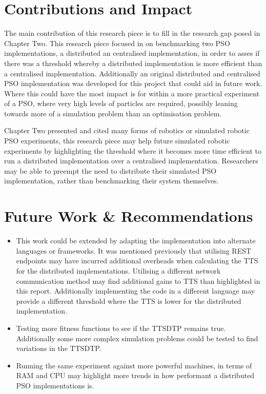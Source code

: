 \documentclass[oneside,12pt]{book}
\begin{document}
\section{Contributions and Impact}
The main contribution of this research piece is to fill in the research gap posed in Chapter Two. This research piece focused in on benchmarking two PSO implementations, a distributed an centralised implementation, in order to asses if there was a threshold whereby a distributed implementation is more efficient than a centralised implementation. Additionally an original distributed and centralised PSO implementation was developed for this project that could aid in future work. Where this could have the most impact is for within a more practical experiment of a PSO, where very high levels of particles are required, possibly leaning towards more of a simulation problem than an optimisation problem.

Chapter Two presented and cited many forms of robotics or simulated robotic PSO experiments, this research piece may help future simulated robotic experiments by highlighting the threshold where it becomes more time efficient to run a distributed implementation over a centralised implementation. Researchers may be able to preempt the need to distribute their simulated PSO implementation, rather than benchmarking their system themselves. 

\section{Future Work \& Recommendations}
\begin{itemize}
\item This work could be extended by adapting the implementation into alternate languages or frameworks. It was mentioned previously that utilising REST endpoints may have incurred additional overheads when calculating the TTS for the distributed implementations. Utilising a different network communication method may find additional gains to TTS than highlighted in this report. Additionally implementing the code in a different language may provide a different threshold where the TTS is lower for the distributed implementation.
\item Testing more fitness functions to see if the TTSDTP remains true. Additionally some more complex simulation problems could be tested to find variations in the TTSDTP.
\item Running the same experiment against more powerful machines, in terms of RAM and CPU may highlight more trends in how performant a distributed PSO implementations is. 
\end{itemize}
\end{document}

